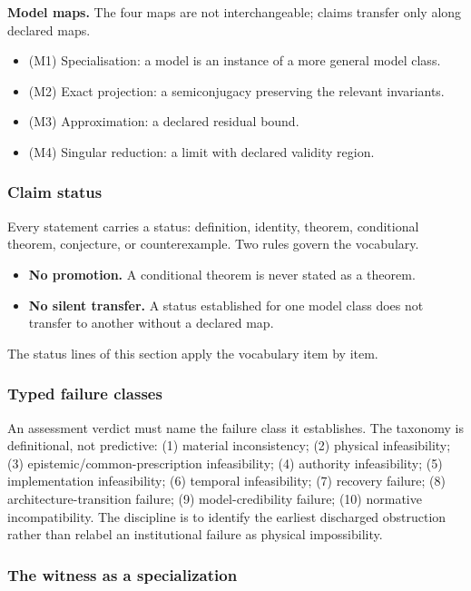 \documentclass[preprint,11pt,authoryear]{elsarticle}
\theoremstyle{remark}
\begin{document}
\textbf{Model maps.} The four maps are not interchangeable; claims transfer only along declared maps.

\begin{itemize}[leftmargin=2em]
\item (M1) Specialisation: a model is an instance of a more general model class.
\item (M2) Exact projection: a semiconjugacy preserving the relevant invariants.
\item (M3) Approximation: a declared residual bound.
\item (M4) Singular reduction: a limit with declared validity region.
\end{itemize}

\subsubsection{Claim status}

Every statement carries a status: definition, identity, theorem, conditional theorem, conjecture, or counterexample. Two rules govern the vocabulary.

\begin{itemize}[leftmargin=2em]
\item \textbf{No promotion.} A conditional theorem is never stated as a theorem.
\item \textbf{No silent transfer.} A status established for one model class does not transfer to another without a declared map.
\end{itemize}

The status lines of this section apply the vocabulary item by item.

\subsubsection{Typed failure classes}

An assessment verdict must name the failure class it establishes. The taxonomy is definitional, not predictive: (1) material inconsistency; (2) physical infeasibility; (3) epistemic/common-prescription infeasibility; (4) authority infeasibility; (5) implementation infeasibility; (6) temporal infeasibility; (7) recovery failure; (8) architecture-transition failure; (9) model-credibility failure; (10) normative incompatibility. The discipline is to identify the earliest discharged obstruction rather than relabel an institutional failure as physical impossibility.

\subsubsection{The witness as a specialization}
\end{document}
